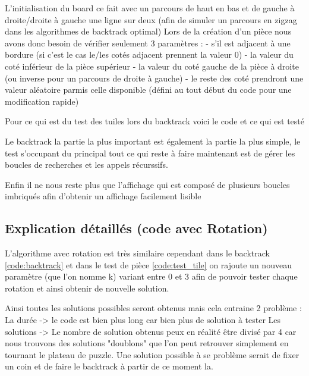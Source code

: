 \documentclass[french]{rapportAlgoM1}
\begin{document}
L'initialisation du board ce fait avec un parcours de haut en bas et de gauche à droite/droite à gauche une ligne sur deux (afin de simuler un parcours en zigzag dans les algorithmes de backtrack optimal)
Lors de la création d'un pièce nous avons donc besoin de vérifier seulement 3 paramètres : 
- s'il est adjacent à une bordure (si c'est le cas le/les cotés adjacent prennent la valeur 0)
- la valeur du coté inférieur de la pièce supérieur
- la valeur du coté gauche de la pièce à droite (ou inverse pour un parcours de droite à gauche)
- le reste des coté prendront une valeur aléatoire parmis celle disponible (défini au tout début du code pour une modification rapide)
 

Pour ce qui est du test des tuiles lors du backtrack voici le code et ce qui est testé
 

Le backtrack la partie la plus important est également la partie la plus simple, le test s'occupant du principal tout ce qui reste à faire maintenant est de gérer les boucles de recherches et les appels récurssifs. 
 

Enfin il ne nous reste plus que l'affichage qui est composé de plusieurs boucles imbriqués afin d'obtenir un affichage facilement lisible 
 

\subsection*{Explication détaillés (code avec Rotation)}

L'algorithme avec rotation est très similaire cependant dans le backtrack \ref{code:backtrack} et dans le test de pièce \ref{code:test_tile} on rajoute un nouveau paramètre (que l'on nomme k) variant entre 0 et 3 afin de pouvoir tester chaque rotation et ainsi obtenir de nouvelle solution.



Ainsi toutes les solutions possibles seront obtenus mais cela entraine 2 problème :
La durée -> le code est bien plus long car bien plus de solution à tester
Les solutions -> Le nombre de solution obtenus peux en réalité être divisé par 4 car nous trouvons des solutions "doublons" que l'on peut retrouver simplement en tournant le plateau de puzzle. Une solution possible à se problème serait de fixer un coin et de faire le backtrack à partir de ce moment la.
\end{document}
